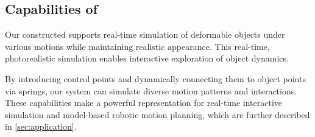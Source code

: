 \subsection{Capabilities of \ourabbr}
Our constructed \ourabbr supports real-time simulation of deformable objects under various motions while maintaining realistic appearance. This real-time, photorealistic simulation enables interactive exploration of object dynamics. 

By introducing control points and dynamically connecting them to object points via springs, our system can simulate diverse motion patterns and interactions. These capabilities make \ourabbr a powerful representation for real-time interactive simulation and model-based robotic motion planning, which are further described in \cref{sec:application}.

